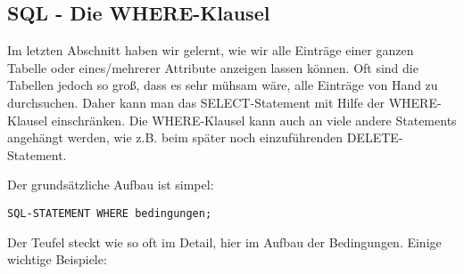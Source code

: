 \subsection[WHERE-Klausel]{SQL - Die WHERE-Klausel}\label{where}
Im letzten Abschnitt haben wir gelernt, wie wir alle Einträge einer ganzen Tabelle oder eines/mehrerer Attribute anzeigen lassen können. Oft sind die Tabellen jedoch so groß, dass es sehr mühsam wäre, alle Einträge von Hand zu durchsuchen. Daher kann man das SELECT-Statement mit Hilfe der WHERE-Klausel einschränken. Die WHERE-Klausel kann auch an viele andere Statements angehängt werden, wie z.B. beim später noch einzuführenden DELETE-Statement.

Der grundsätzliche Aufbau ist simpel:
\begin{tcolorbox}[title=WHERE-Klausel]
	\lstinline!SQL-STATEMENT WHERE bedingungen;!
\end{tcolorbox}
Der Teufel steckt wie so oft im Detail, hier im Aufbau der Bedingungen. Einige wichtige Beispiele:
